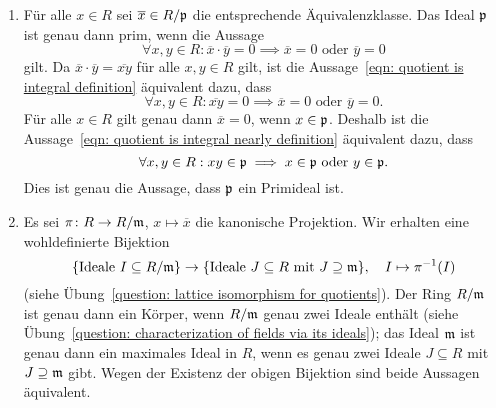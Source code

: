 \begin{solution}
  \begin{enumerate}
    \item
      Für alle $x \in R$ sei $\overline{x} \in R/\mathfrak{p}$ die entsprechende Äquivalenzklasse.
      Das Ideal $\mathfrak{p}$ ist genau dann prim, wenn die Aussage
      \begin{equation}
        \label{eqn: quotient is integral definition}
        \forall x, y \in R
        :
        \overline{x} \cdot \overline{y} = 0
        \implies
        \text{$\overline{x} = 0$ oder $\overline{y} = 0$}
      \end{equation}
      gilt. Da $\overline{x} \cdot \overline{y} = \overline{xy}$ für alle $x, y \in R$ gilt, ist die Aussage~\eqref{eqn: quotient is integral definition} äquivalent dazu, dass
      \begin{equation}
        \label{eqn: quotient is integral nearly definition}
        \forall x, y \in R
        :
        \overline{xy} = 0
        \implies
        \text{$\overline{x} = 0$ oder $\overline{y} = 0$}.
      \end{equation}
      Für alle $x \in R$ gilt genau dann $\overline{x} = 0$, wenn $x \in \mathfrak{p}$.
      Deshalb ist die Aussage~\eqref{eqn: quotient is integral nearly definition} äquivalent dazu, dass
      \begin{equation}
        \label{eqn: quotient is integral via prime }
        \forall x, y \in R
        :
        xy \in \mathfrak{p}
        \implies
        \text{$x \in \mathfrak{p}$ oder $y \in \mathfrak{p}$}.
      \end{equation}
      Dies ist genau die Aussage, dass $\mathfrak{p}$ ein Primideal ist.
    \item
      Es sei $\pi \colon R \to R/\mathfrak{m}$, $x \mapsto \overline{x}$ die kanonische Projektion.
      Wir erhalten eine wohldefinierte Bijektion
      \[
            \{ \text{Ideale $I \subseteq R/\mathfrak{m}$} \}
        \to \{ \text{Ideale $J \subseteq R$ mit $J \supseteq \mathfrak{m}$} \},
        \quad
        I \mapsto \pi^{-1}(I)
      \]
      (siehe Übung~\ref{question: lattice isomorphism for quotients}).
      Der Ring $R/\mathfrak{m}$ ist genau dann ein Körper, wenn $R/\mathfrak{m}$ genau zwei Ideale enthält (siehe Übung~\ref{question: characterization of fields via its ideals}); das Ideal $\mathfrak{m}$ ist genau dann ein maximales Ideal in $R$, wenn es genau zwei Ideale $J \subseteq R$ mit $J \supseteq \mathfrak{m}$ gibt.
      Wegen der Existenz der obigen Bijektion sind beide Aussagen äquivalent.
  \end{enumerate}
\end{solution}


